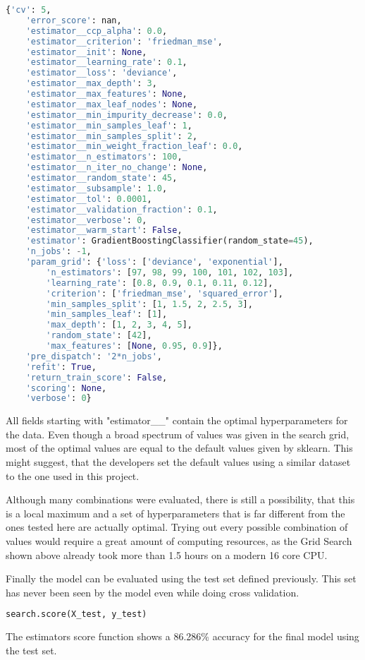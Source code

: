 \begin{lstlisting}[language=Python]
    {'cv': 5,
    'error_score': nan,
    'estimator__ccp_alpha': 0.0,
    'estimator__criterion': 'friedman_mse',
    'estimator__init': None,
    'estimator__learning_rate': 0.1,
    'estimator__loss': 'deviance',
    'estimator__max_depth': 3,
    'estimator__max_features': None,
    'estimator__max_leaf_nodes': None,
    'estimator__min_impurity_decrease': 0.0,
    'estimator__min_samples_leaf': 1,
    'estimator__min_samples_split': 2,
    'estimator__min_weight_fraction_leaf': 0.0,
    'estimator__n_estimators': 100,
    'estimator__n_iter_no_change': None,
    'estimator__random_state': 45,
    'estimator__subsample': 1.0,
    'estimator__tol': 0.0001,
    'estimator__validation_fraction': 0.1,
    'estimator__verbose': 0,
    'estimator__warm_start': False,
    'estimator': GradientBoostingClassifier(random_state=45),
    'n_jobs': -1,
    'param_grid': {'loss': ['deviance', 'exponential'],
        'n_estimators': [97, 98, 99, 100, 101, 102, 103],
        'learning_rate': [0.8, 0.9, 0.1, 0.11, 0.12],
        'criterion': ['friedman_mse', 'squared_error'],
        'min_samples_split': [1, 1.5, 2, 2.5, 3],
        'min_samples_leaf': [1],
        'max_depth': [1, 2, 3, 4, 5],
        'random_state': [42],
        'max_features': [None, 0.95, 0.9]},
    'pre_dispatch': '2*n_jobs',
    'refit': True,
    'return_train_score': False,
    'scoring': None,
    'verbose': 0}
\end{lstlisting}

All fields starting with "estimator\_\_" contain the optimal hyperparameters for the data.
Even though a broad spectrum of values was given in the search grid, most of the optimal values 
are equal to the default values given by sklearn. This might suggest, that the developers
set the default values using a similar dataset to the one used in this project.

Although many combinations were evaluated, there is still a possibility, that this is a local 
maximum and a set of hyperparameters that is far different from the ones tested here are actually
optimal. Trying out every possible combination of values would require a great amount of 
computing resources, as the Grid Search shown above already took more than 1.5 hours on a 
modern 16 core CPU.

Finally the model can be evaluated using the test set defined previously. This set has never been 
seen by the model even while doing cross validation.

\begin{lstlisting}[language=Python]
    search.score(X_test, y_test)
\end{lstlisting}

The estimators score function shows a 86.286\% accuracy for the final model using the test set.
